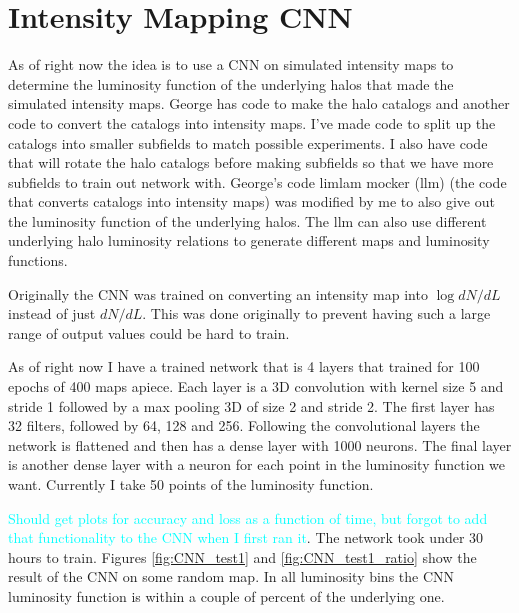 \documentclass{article}
\newcommand{\dnp}[1]{\textcolor{cyan}{#1}}
\begin{document}
	\section{Intensity Mapping CNN} \label{sec:cnn}

		As of right now the idea is to use a CNN on simulated intensity maps to determine the luminosity function of the underlying halos that made the simulated intensity maps.  George has code to make the halo catalogs and another code to convert the catalogs into intensity maps.  I've made code to split up the catalogs into smaller subfields to match possible experiments.  I also have code that will rotate the halo catalogs before making subfields so that we have more subfields to train out network with.  George's code limlam mocker (llm) (the code that converts catalogs into intensity maps) was modified by me to also give out the luminosity function of the underlying halos.  The llm can also use different underlying halo luminosity relations to generate different maps and luminosity functions.

		Originally the CNN was trained on converting an intensity map into \(\log dN/dL\) instead of just \(dN/dL\).  This was done originally to prevent having such a large range of output values could be hard to train.

		As of right now I have a trained network that is 4 layers that trained for 100 epochs of 400 maps apiece.  Each layer is a 3D convolution with kernel size 5 and stride 1 followed by a max pooling 3D of size 2 and stride 2.  The first layer has 32 filters, followed by 64, 128 and 256.  Following the convolutional layers the network is flattened and then has a dense layer with 1000 neurons.  The final layer is another dense layer with a neuron for each point in the luminosity function we want.  Currently I take 50 points of the luminosity function.  

		\dnp{Should get plots for accuracy and loss as a function of time, but forgot to add that functionality to the CNN when I first ran it}.  The network took under 30 hours to train.  Figures \ref{fig:CNN_test1} and \ref{fig:CNN_test1_ratio} show the result of the CNN on some random map.  In all luminosity bins the CNN luminosity function is within a couple of percent of the underlying one.
\end{document}

